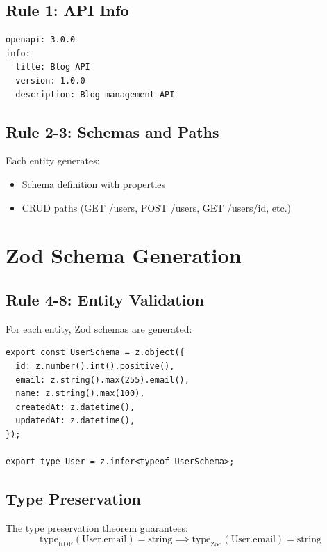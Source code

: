\subsection{Rule 1: API Info}

\begin{verbatim}
openapi: 3.0.0
info:
  title: Blog API
  version: 1.0.0
  description: Blog management API
\end{verbatim}

\subsection{Rule 2-3: Schemas and Paths}

Each entity generates:
\begin{itemize}
    \item Schema definition with properties
    \item CRUD paths (GET /users, POST /users, GET /users/{id}, etc.)
\end{itemize}

\section{Zod Schema Generation}

\subsection{Rule 4-8: Entity Validation}

For each entity, Zod schemas are generated:

\begin{verbatim}
export const UserSchema = z.object({
  id: z.number().int().positive(),
  email: z.string().max(255).email(),
  name: z.string().max(100),
  createdAt: z.datetime(),
  updatedAt: z.datetime(),
});

export type User = z.infer<typeof UserSchema>;
\end{verbatim}

\subsection{Type Preservation}

The type preservation theorem guarantees:
\begin{equation}
    \text{type}_{\text{RDF}}(\text{User.email}) = \text{string} \implies \text{type}_{\text{Zod}}(\text{User.email}) = \text{string}
\end{equation}

